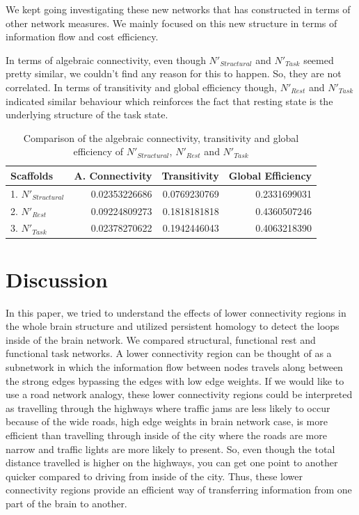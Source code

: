 \documentclass[9pt,twocolumn,twoside,lineno]{pnas-new}
\begin{document}
We kept going investigating these new networks that has constructed in terms of other network measures. We mainly focused on this new structure in terms of information flow and cost efficiency.

In terms of algebraic connectivity, even though $N'_{Structural}$ and $N'_{Task}$ seemed pretty similar, we couldn't find any reason for this to happen. So, they are not correlated. In terms of transitivity and global efficiency though, $N'_{Rest}$ and $N'_{Task}$ indicated similar behaviour which reinforces the fact that resting state is the underlying structure of the task state. 


\begin{table}%
\centering
\caption{Comparison of the algebraic connectivity, transitivity and global efficiency of $N'_{Structural}$, $N'_{Rest}$ and $N'_{Task}$}
\begin{tabular}{lrrr}
Scaffolds & A. Connectivity & Transitivity & Global Efficiency \\
\midrule
1. $N'_{Structural}$ & 0.02353226686 & 0.0769230769 & 0.2331699031 \\
2. $N'_{Rest}$ & 0.09224809273 & 0.1818181818 & 0.4360507246 \\
3. $N'_{Task}$ & 0.02378270622 & 0.1942446043 & 0.4063218390\\
\bottomrule
\end{tabular}

\end{table}

\section*{Discussion}

In this paper, we tried to understand the effects of lower connectivity regions in the whole brain structure and utilized persistent homology to detect the loops inside of the brain network. We compared structural, functional rest and functional task networks. A lower connectivity region can be thought of as a subnetwork in which the information flow between nodes travels along between the strong edges bypassing the edges with low edge weights. If we would like to use a road network analogy, these lower connectivity regions could be interpreted as travelling through the highways where traffic jams are less likely to occur because of the wide roads, high edge weights in brain network case, is more efficient than travelling through inside of the city where the roads are more narrow and traffic lights are more likely to present. So, even though the total distance travelled is higher on the highways, you can get one point to another quicker compared to driving from inside of the city. Thus, these lower connectivity regions provide an efficient way of transferring information from one part of the brain to another.
\end{document}
